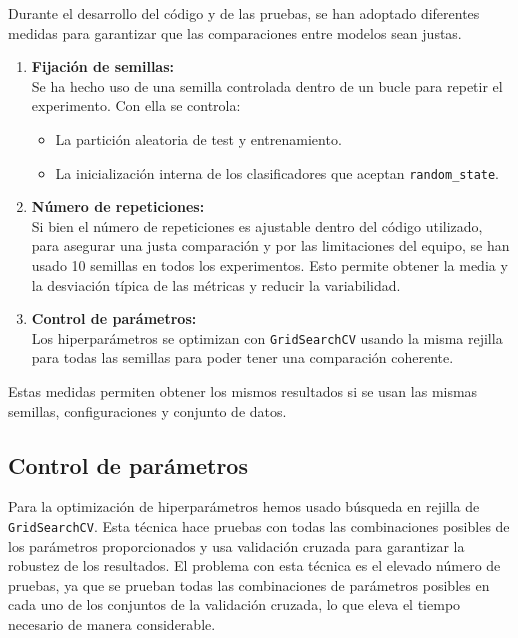 Durante el desarrollo del código y de las pruebas, se han adoptado diferentes medidas para garantizar que las comparaciones entre modelos sean justas.

\begin{enumerate}
	\item \textbf{Fijación de semillas:}\\
		Se ha hecho uso de una semilla controlada dentro de un bucle para repetir el experimento. Con ella se controla:

		\begin{itemize}
			\item La partición aleatoria de test y entrenamiento.
			\item La inicialización interna de los clasificadores que aceptan \texttt{random\_state}.
		\end{itemize}
	\item \textbf{Número de repeticiones:}\\
		Si bien el número de repeticiones es ajustable dentro del código utilizado, para asegurar una justa comparación y por las limitaciones del equipo, se han usado 10 semillas en todos los experimentos. Esto permite obtener la media y la desviación típica de las métricas y reducir la variabilidad.
	\item \textbf{Control de parámetros:}\\
		Los hiperparámetros se optimizan con \texttt{GridSearchCV} usando la misma rejilla para todas las semillas para poder tener una comparación coherente.
\end{enumerate}

Estas medidas permiten obtener los mismos resultados si se usan las mismas semillas, configuraciones y conjunto de datos.

\subsection{Control de parámetros}
\label{subsec:control}

Para la optimización de hiperparámetros hemos usado búsqueda en rejilla de \texttt{GridSearchCV}. Esta técnica hace pruebas con todas las combinaciones posibles de los parámetros proporcionados y usa validación cruzada para garantizar la robustez de los resultados. El problema con esta técnica es el elevado número de pruebas, ya que se prueban todas las combinaciones de parámetros posibles en cada uno de los conjuntos de la validación cruzada, lo que eleva el tiempo necesario de manera considerable.

